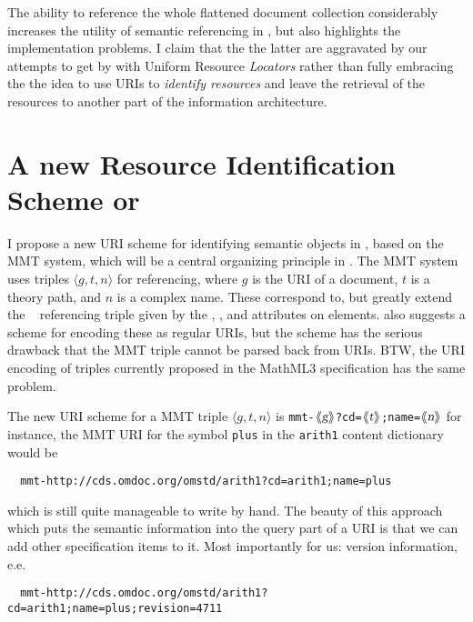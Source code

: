 \documentclass[12pt]{article}
\def\llquote#1{\ensuremath{\langle\kern-.25em\langle\hbox{\sl{#1}}\rangle\kern-.25em\rangle}}
\begin{document}
The ability to reference the whole flattened document collection considerably increases
the utility of semantic referencing in {\omdoc}, but also highlights the implementation
problems. I claim that the the latter are aggravated by our attempts to get by with
Uniform Resource {\emph{Locators}} rather than fully embracing the the idea to use URIs to
{\emph{identify resources}} and leave the retrieval of the resources to another part of
the information architecture.

\section{A new Resource Identification Scheme or {\omdoc}}

I propose a new URI scheme for identifying semantic objects in {}, based on the
MMT system, which will be a central organizing principle in {}. The MMT system
uses triples $\langle g,t,n\rangle$ for referencing, where $g$ is the URI of a document,
$t$ is a theory path, and $n$ is a complex name. These correspond to, but greatly extend
the {\openmath}~\cite{BusCapCar:2oms04} referencing triple given by the
{}, {}, and {} attributes on
{} elements. {\cite{RabKoh:WSMSML08}} also suggests a scheme for encoding
these as regular URIs, but the scheme has the serious drawback that the MMT triple cannot
be parsed back from URIs. BTW, the URI encoding of {\openmath} triples currently proposed
in the MathML3 specification has the same problem.

The new URI scheme for a MMT triple $\langle g,t,n\rangle$ is
{\texttt{mmt-$\llquote{g}$?cd=$\llquote{t}$;name=$\llquote{n}$}} for instance, the MMT URI
for the symbol {\texttt{plus}} in the {\texttt{arith1}} content dictionary would be 

\begin{verbatim}
  mmt-http://cds.omdoc.org/omstd/arith1?cd=arith1;name=plus
\end{verbatim}

which is still quite manageable to write by hand. The beauty of this approach which puts
the semantic information into the query part of a URI is that we can add other
specification items to it. Most importantly for us: version information, e.e. 

\begin{verbatim}
  mmt-http://cds.omdoc.org/omstd/arith1?cd=arith1;name=plus;revision=4711
\end{verbatim}
\end{document}
